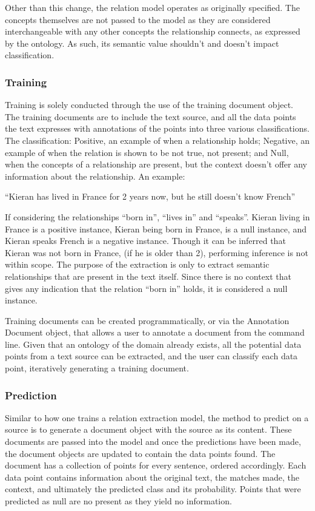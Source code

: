 \documentclass[11pt]{article} %
\begin{document}
Other than this change, the relation model operates as originally specified. The concepts themselves are not passed to the model as they are considered interchangeable with any other concepts the relationship connects, as expressed by the ontology. As such, its semantic value shouldn’t and doesn’t impact classification.

\subsubsection{Training}

Training is solely conducted through the use of the training document object. The training documents are to include the text source, and all the data points the text expresses with annotations of the points into three various classifications. The classification: Positive, an example of when a relationship holds; Negative, an example of when the relation is shown to be not true, not present; and Null, when the concepts of a relationship are present, but the context doesn’t offer any information about the relationship. An example:

“Kieran has lived in France for 2 years now, but he still doesn’t know French”

If considering the relationships “born in”, “lives in” and “speaks”. Kieran living in France is a positive instance, Kieran being born in France, is a null instance, and Kieran speaks French is a negative instance. Though it can be inferred that Kieran was not born in France, (if he is older than 2), performing inference is not within scope. The purpose of the extraction is only to extract semantic relationships that are present in the text itself. Since there is no context that gives any indication that the relation “born in” holds, it is considered a null instance.

Training documents can be created programmatically, or via the Annotation Document object, that allows a user to annotate a document from the command line. Given that an ontology of the domain already exists, all the potential data points from a text source can be extracted, and the user can classify each data point, iteratively generating a training document.

\subsubsection{Prediction}

Similar to how one trains a relation extraction model, the method to predict on a source is to generate a document object with the source as its content. These documents are passed into the model and once the predictions have been made, the document objects are updated to contain the data points found. The document has a collection of points for every sentence, ordered accordingly. Each data point contains information about the original text, the matches made, the context, and ultimately the predicted class and its probability. Points that were predicted as null are no present as they yield no information.
\end{document}
